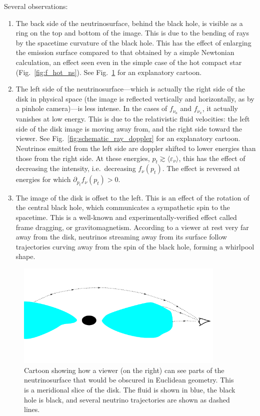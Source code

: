 Several observations:
\begin{enumerate}
  \item The back side of the neutrinosurface, behind the black hole, is visible
    as a ring on the top and bottom of the image.
    This is due to the bending of rays by the spacetime curvature of the black
    hole. This has the effect of enlarging the emission surface compared to
    that obtained by a simple Newtonian calculation, an effect seen even in
    the simple case of the hot compact star (Fig.~\ref{fig:f_hot_ns}).
    See Fig.~\ref{fig:schematic_ray_bending} for an explanatory cartoon.
  \item The left side of the neutrinosurface---which is actually the right
    side of the disk in physical space (the image is reflected vertically and
    horizontally, as by a pinhole camera)---is less intense. In the cases of
    $f_{\nu_a}$ and $f_{\nu_x}$, it actually vanishes at low energy.
    This is due to the relativistic fluid velocities: the left side of the disk
    image is moving away from, and the right side toward the viewer.
    See Fig.~\ref{fig:schematic_ray_doppler} for an explanatory cartoon.
    Neutrinos emitted from the left side are doppler shifted to lower energies
    than those from the right side. At these energies,
    $p_t\gtrsim\langle\varepsilon_\nu\rangle$,
    this has the effect of decreasing the intensity, i.e.\ decreasing
    $f_\nu(p_t)$.
    The effect is reversed at energies for which
    $\partial_{p_t}f_\nu(p_t)>0$.
  \item The image of the disk is offset to the left. This is an effect of the
    rotation of the central black hole, which communicates a sympathetic spin
    to the spacetime. This is a well-known and experimentally-verified effect
    called frame dragging, or gravitomagnetism.
    According to a viewer at rest very far away from the disk, neutrinos
    streaming away from its surface follow trajectories curving away from
    the spin of the black hole, forming a whirlpool shape.
\end{enumerate}

\begin{figure}
  \centering
  \includegraphics[width=10cm]{Figures/seeing_back_of_disk}
  \caption[Cartoon of neutrino rays bending over the disk]{
    Cartoon showing how a viewer (on the right) can see parts of the
    neutrinosurface that would be obscured in Euclidean geometry.
    This is a meridional slice of the disk. The fluid is shown in blue, the
    black hole is black, and several neutrino trajectories are shown as dashed
    lines.
  }
  \label{fig:schematic_ray_bending}
\end{figure}

